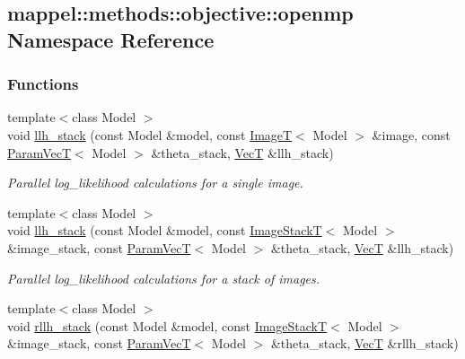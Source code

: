 \hypertarget{namespacemappel_1_1methods_1_1objective_1_1openmp}{}\subsection{mappel\+:\+:methods\+:\+:objective\+:\+:openmp Namespace Reference}
\label{namespacemappel_1_1methods_1_1objective_1_1openmp}
\subsubsection*{Functions}
\begin{DoxyCompactItemize}
\item 
{\footnotesize template$<$class Model $>$ }\\void \hyperlink{namespacemappel_1_1methods_1_1objective_1_1openmp_ac3b3259220fa0dad56adb3db28711c55}{llh\+\_\+stack} (const Model \&model, const \hyperlink{namespacemappel_a14658186b77757f3c35a69cb1be6cf4b}{ImageT}$<$ Model $>$ \&image, const \hyperlink{namespacemappel_a0f86d3153e4e27b095012f140eea58de}{Param\+VecT}$<$ Model $>$ \&theta\+\_\+stack, \hyperlink{namespacemappel_a2225ad69f358daa3f4f99282a35b9a3a}{VecT} \&llh\+\_\+stack)
\begin{DoxyCompactList}\small\item\em Parallel log\+\_\+likelihood calculations for a single image. \end{DoxyCompactList}\item 
{\footnotesize template$<$class Model $>$ }\\void \hyperlink{namespacemappel_1_1methods_1_1objective_1_1openmp_aacd838da9a8dd9462fe970b4e3fae0f0}{llh\+\_\+stack} (const Model \&model, const \hyperlink{namespacemappel_a636dbe5b195c267a5f6a65cd48ff94a6}{Image\+StackT}$<$ Model $>$ \&image\+\_\+stack, const \hyperlink{namespacemappel_a0f86d3153e4e27b095012f140eea58de}{Param\+VecT}$<$ Model $>$ \&theta\+\_\+stack, \hyperlink{namespacemappel_a2225ad69f358daa3f4f99282a35b9a3a}{VecT} \&llh\+\_\+stack)
\begin{DoxyCompactList}\small\item\em Parallel log\+\_\+likelihood calculations for a stack of images. \end{DoxyCompactList}\item 
{\footnotesize template$<$class Model $>$ }\\void \hyperlink{namespacemappel_1_1methods_1_1objective_1_1openmp_a8223d746bf91530f8cff4ec168e50b1d}{rllh\+\_\+stack} (const Model \&model, const \hyperlink{namespacemappel_a636dbe5b195c267a5f6a65cd48ff94a6}{Image\+StackT}$<$ Model $>$ \&image\+\_\+stack, const \hyperlink{namespacemappel_a0f86d3153e4e27b095012f140eea58de}{Param\+VecT}$<$ Model $>$ \&theta\+\_\+stack, \hyperlink{namespacemappel_a2225ad69f358daa3f4f99282a35b9a3a}{VecT} \&rllh\+\_\+stack)

\end{DoxyCompactItemize}
